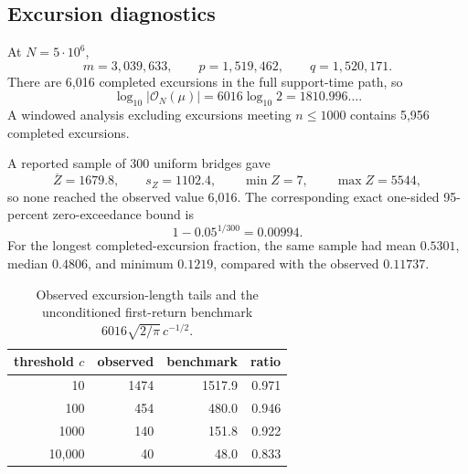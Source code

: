 \documentclass[11pt,reqno]{amsart}
\numberwithin{equation}{section}
\theoremstyle{plain}
\theoremstyle{definition}
\theoremstyle{remark}
\newcommand{\cO}{\mathcal O}
\begin{document}
\subsection{Excursion diagnostics}
\label{subsec:numerical-excursions}

At \(N=5\cdot10^6\),
\begin{equation}
m=3{,}039{,}633,\qquad
p=1{,}519{,}462,\qquad q=1{,}520{,}171.
\label{eq:five-million-sign-counts}
\end{equation}
There are 6,016 completed excursions in the full support-time path, so
\begin{equation}
\log_{10}|\cO_N(\mu)|
=6016\log_{10}2=1810.996\ldots.
\label{eq:reflection-orbit-decimal-size}
\end{equation}
A windowed analysis excluding excursions meeting \(n\leq1000\) contains
5,956 completed excursions.

A reported sample of 300 uniform bridges gave
\begin{equation}
\overline Z=1679.8,\qquad s_Z=1102.4,\qquad
\min Z=7,\qquad\max Z=5544,
\label{eq:return-sample-summary}
\end{equation}
so none reached the observed value 6,016.  The corresponding exact one-sided
95-percent zero-exceedance bound is
\begin{equation}
1-0.05^{1/300}=0.00994.
\label{eq:three-hundred-zero-bound}
\end{equation}
For the longest completed-excursion fraction, the same sample had mean
\(0.5301\), median \(0.4806\), and minimum \(0.1219\), compared with the
observed \(0.11737\).

\begin{table}[htbp]
\centering
\caption{Observed excursion-length tails and the unconditioned first-return
benchmark \(6016\sqrt{2/\pi}\,c^{-1/2}\).}
\label{tab:excursion-tail}
\begin{tabular}{r r r r}
\toprule
threshold \(c\)&observed&benchmark&ratio\\
\midrule
10&1474&1517.9&0.971\\
100&454&480.0&0.946\\
1000&140&151.8&0.922\\
10,000&40&48.0&0.833\\
\bottomrule
\end{tabular}
\end{table}
\end{document}
